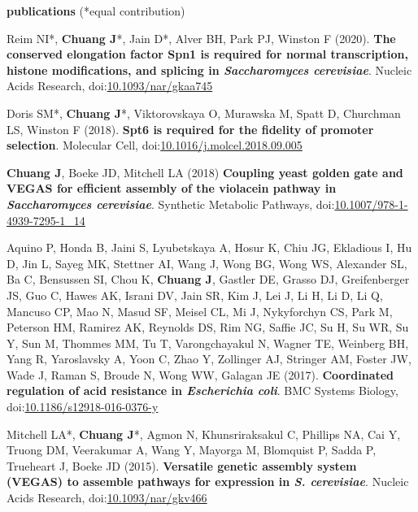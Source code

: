 \documentclass[11pt, a4paper]{article}
\begin{document}
\vspace{1em}
\textbf{\Large publications} (*equal contribution)
\begin{description}[topsep=2pt, align=right, leftmargin=!, labelwidth=\widthof{\textbf{2018}}]
    \item [2020] Reim NI*, \textbf{Chuang J}*, Jain D*, Alver BH, Park PJ, Winston F (2020). \textbf{The conserved elongation factor Spn1 is required for normal transcription, histone modifications, and splicing in \textit{Saccharomyces cerevisiae}}. Nucleic Acids Research, doi:\href{https://doi.org/10.1093/nar/gkaa745}{10.1093/nar/gkaa745}
    \item [2018] Doris SM*, \textbf{Chuang J}*, Viktorovskaya O, Murawska M, Spatt D, Churchman LS, Winston F (2018). \textbf{Spt6 is required for the fidelity of promoter selection}. Molecular Cell, doi:\href{https://doi.org/10.1016/j.molcel.2018.09.005}{10.1016/j.molcel.2018.09.005}
    \item [2018] \textbf{Chuang J}, Boeke JD, Mitchell LA (2018) \textbf{Coupling yeast golden gate and VEGAS for efficient assembly of the violacein pathway in \textit{Saccharomyces cerevisiae}}. Synthetic Metabolic Pathways, doi:\href{https://doi.org/10.1007/978-1-4939-7295-1_14}{10.1007/978-1-4939-7295-1\_14}
    \item [2017] Aquino P, Honda B, Jaini S, Lyubetskaya A, Hosur K, Chiu JG, Ekladious I, Hu D, Jin L, Sayeg MK, Stettner AI, Wang J, Wong BG, Wong WS, Alexander SL, Ba C, Bensussen SI, Chou K, \textbf{Chuang J}, Gastler DE, Grasso DJ, Greifenberger JS, Guo C, Hawes AK, Israni DV, Jain SR, Kim J, Lei J, Li H, Li D, Li Q, Mancuso CP, Mao N, Masud SF, Meisel CL, Mi J, Nykyforchyn CS, Park M, Peterson HM, Ramirez AK, Reynolds DS, Rim NG, Saffie JC, Su H, Su WR, Su Y, Sun M, Thommes MM, Tu T, Varongchayakul N, Wagner TE, Weinberg BH, Yang R, Yaroslavsky A, Yoon C, Zhao Y, Zollinger AJ, Stringer AM, Foster JW, Wade J, Raman S, Broude N, Wong WW, Galagan JE (2017). \textbf{Coordinated regulation of acid resistance in \textit{Escherichia coli}}. BMC Systems Biology, doi:\href{https://doi.org/10.1186/s12918-016-0376-y}{10.1186/s12918-016-0376-y}
    \item [2015] Mitchell LA*, \textbf{Chuang J}*, Agmon N, Khunsriraksakul C, Phillips NA, Cai Y, Truong DM, Veerakumar A, Wang Y, Mayorga M, Blomquist P, Sadda P, Trueheart J, Boeke JD (2015). \textbf{Versatile genetic assembly system (VEGAS) to assemble pathways for expression in \textit{S. cerevisiae}}. Nucleic Acids Research, doi:\href{https://doi.org/10.1093/nar/gkv466}{10.1093/nar/gkv466}

\end{description}
\end{document}
